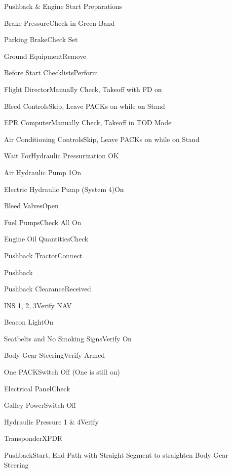 \documentclass[sim-use]{checklist}
\begin{document}
\begin{checklist}{Pushback \& Engine Start Preparations}
	\item{Brake Pressure}{Check in Green Band}
	\item{Parking Brake}{Check Set}
	\item{Ground Equipment}{Remove}
	\item{Before Start Checklists}{Perform}
	 {
		\item{Flight Director}{Manually Check, Takeoff with FD on}
		\item{Bleed Controls}{Skip, Leave PACKs on while on Stand}
		\item{EPR Computer}{Manually Check, Takeoff in TOD Mode}
		\item{Air Conditioning Controls}{Skip, Leave PACKs on while on Stand}
	}
	 {
		\item{Wait For}{Hydraulic Pressurization OK}
		\item{Air Hydraulic Pump 1}{On}
		\item{Electric Hydraulic Pump (System 4)}{On}
	}
	\item{Bleed Valves}{Open}
	\item{Fuel Pumps}{Check All On}
	\item{Engine Oil Quantities}{Check}
	\item{Pushback Tractor}{Connect}
\end{checklist}

\begin{checklist}{Pushback}
	\item{Pushback Clearance}{Received}
	\item{INS 1, 2, 3}{Verify NAV}
	\item{Beacon Light}{On}
	\item{Seatbelts and No Smoking Signs}{Verify On}
	\item{Body Gear Steering}{Verify Armed}
	\item{One PACK}{Switch Off (One is still on)}
	\item{Electrical Panel}{Check}
	\item{Galley Power}{Switch Off}
	\item{Hydraulic Pressure 1 \& 4}{Verify}
	\item{Transponder}{XPDR}
	\item{Pushback}{Start, End Path with Straight Segment to straighten Body Gear Steering}
\end{checklist}
\end{document}
